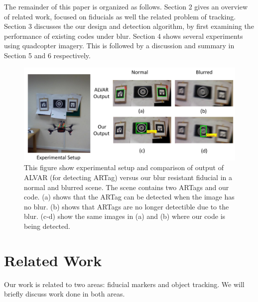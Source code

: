 \documentclass[runningheads]{llncs}
\begin{document}
The remainder of this paper is organized as follows.   Section 2 gives an
overview of related work, focused on fiducials as well the related problem of
tracking.  Section 3 discusses the our design and detection algorithm, by first
examining the performance of existing codes under blur. Section 4 shows several
experiments using quadcopter imagery.  This is followed by a discussion and
summary in Section 5 and 6 respectively.

\begin{figure}
\includegraphics[width=\linewidth]{teaser.pdf}
\caption{This figure show experimental setup and comparison of
output of ALVAR\cite{alvar} (for detecting ARTag) versus our blur resistant fiducial
in a normal and blurred scene. The scene contains two ARTags and our code.
(a) shows that the ARTag can be detected when the image has no blur. 
(b) shows that ARTags are no longer detectible due to the blur.
(c-d) show the same images in (a) and (b) where our code is being detected.}
\label{fig:teaser}
\end{figure}

\section{Related Work}

Our work is related to two areas: fiducial markers and object tracking. We will
briefly discuss work done in both areas.
\end{document}
